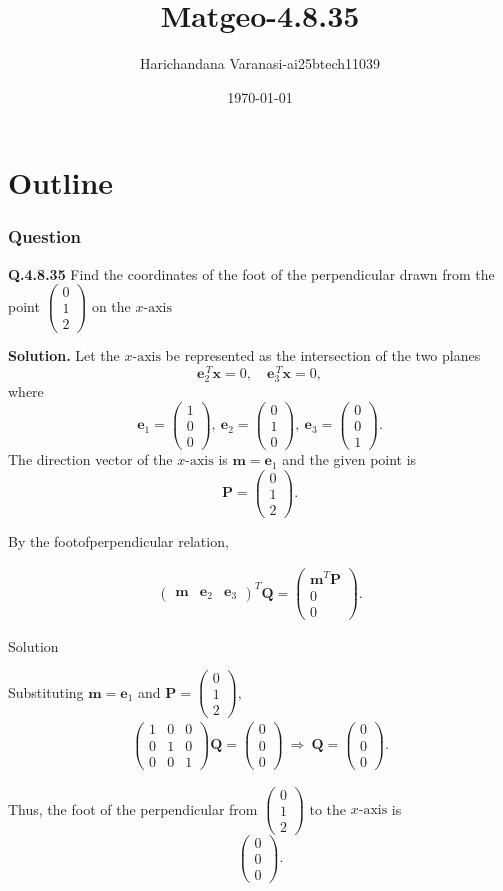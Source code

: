 \documentclass{beamer}
\title{Matgeo-4.8.35}
\author{Harichandana Varanasi-ai25btech11039}
\date{\today}
\theoremstyle{remark}
\newcommand{\myvec}[1]{\ensuremath{\begin{pmatrix}#1\end{pmatrix}}}
\let\vec\mathbf
\begin{document}
\begin{frame}
\titlepage
\end{frame}

\section*{Outline}

\begin{frame}
\frametitle{Question}

\textbf{Q.4.8.35} Find the coordinates of the foot of the perpendicular drawn from the point $\myvec{0\\1\\2}$ on the $x\text{-axis}$


\end{frame}
%
\begin{frame}

\textbf{Solution.}
Let the $x\text{-axis}$
 be represented as the intersection of the two planes
\[
\vec{e}_2^{\,T}\vec{x}=0,\quad \vec{e}_3^{\,T}\vec{x}=0,
\]
where
\[
\vec{e}_1=\myvec{1\\0\\0},\ \vec{e}_2=\myvec{0\\1\\0},\ \vec{e}_3=\myvec{0\\0\\1}.
\]
The direction vector of the $x\text{-axis}$
 is $\vec{m}=\vec{e}_1$ and the given point is
\[
\vec{P}=\myvec{0\\1\\2}.
\]

By the foot\text{-}of\text{-}perpendicular relation,

\begin{align}
\myvec{\vec{m}&\vec{e}_2&\vec{e}_3}^{\!T}\vec{Q}
=\myvec{\vec{m}^{T}\vec{P}\\[2pt]0\\[2pt]0}.
\tag{1}
\end{align}
\end{frame}
\begin{frame}{Solution}
    
Substituting $\vec{m}=\vec{e}_1$ and $\vec{P}=\myvec{0\\1\\2}$,
\begin{align}
\myvec{1&0&0\\[2pt]0&1&0\\[2pt]0&0&1}\vec{Q}
=\myvec{0\\[2pt]0\\[2pt]0}
\ \Longrightarrow\ 
\vec{Q}=\myvec{0\\0\\0}.
\tag{2}
\end{align}

Thus, the foot of the perpendicular from $\myvec{0\\1\\2}$ to the $x\text{-axis}$
 is
\[
\boxed{\myvec{0\\0\\0}}.
\]


\end{frame}
\end{document}
